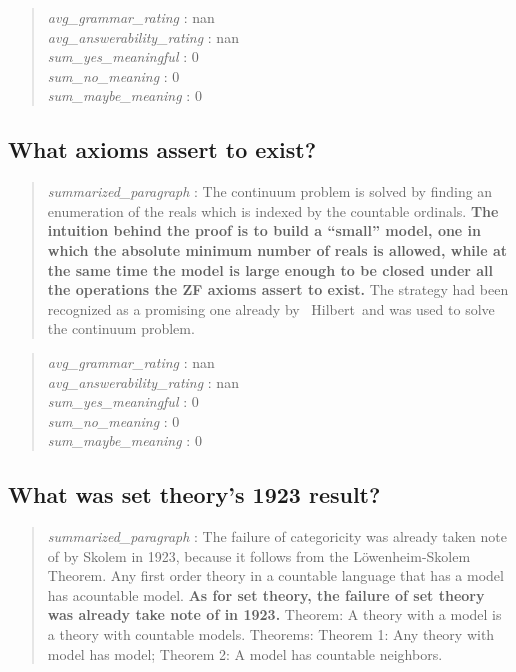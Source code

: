 \begin{quote}
\emph{avg\_grammar\_rating} : nan\\
\emph{avg\_answerability\_rating} : nan\\
\emph{sum\_yes\_meaningful} : 0\\
\emph{sum\_no\_meaning} : 0\\
\emph{sum\_maybe\_meaning} : 0
\end{quote}

\hypertarget{what-axioms-assert-to-exist}{%
\subsection{What axioms assert to
exist?}\label{what-axioms-assert-to-exist}}

\begin{quote}
\emph{summarized\_paragraph} : The continuum problem is solved by
finding an enumeration of the reals which is indexed by the countable
ordinals. \textbf{The intuition behind the proof is to build a ``small''
model, one in which the absolute minimum number of reals is allowed,
while at the same time the model is large enough to be closed under all
the operations the ZF axioms assert to exist.} The strategy had been
recognized as a promising one already by ~Hilbert~and was used to solve
the continuum problem.
\end{quote}

\begin{quote}
\emph{avg\_grammar\_rating} : nan\\
\emph{avg\_answerability\_rating} : nan\\
\emph{sum\_yes\_meaningful} : 0\\
\emph{sum\_no\_meaning} : 0\\
\emph{sum\_maybe\_meaning} : 0
\end{quote}

\hypertarget{what-was-set-theorys-1923-result}{%
\subsection{What was set theory's 1923
result?}\label{what-was-set-theorys-1923-result}}

\begin{quote}
\emph{summarized\_paragraph} : The failure of categoricity was already
taken note of by Skolem in 1923, because it follows from the
Löwenheim-Skolem Theorem. Any first order theory in a countable language
that has a model has acountable model. \textbf{As for set theory, the
failure of set theory was already take note of in 1923.} Theorem: A
theory with a model is a theory with countable models. Theorems: Theorem
1: Any theory with model has model; Theorem 2: A model has countable
neighbors.
\end{quote}

